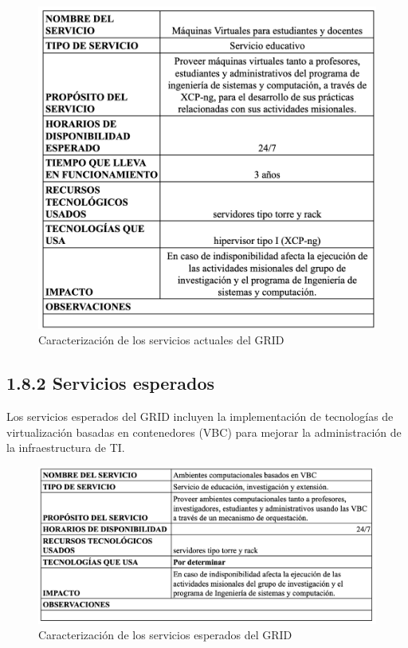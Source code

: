 \begin{figure}[H]
    \centering
    \includegraphics[width=\textwidth] {tablas-images/cp1/servicios-actuales/servicios-actuales.png}
    \caption{Caracterización de los servicios actuales del GRID}\label{fig:servicios-actuales}
\end{figure}

\subsection*{1.8.2 Servicios esperados}
Los servicios esperados del GRID incluyen la implementación de tecnologías de virtualización basadas en contenedores (VBC) para mejorar la administración de la infraestructura de TI.

\begin{figure}[H]
    \centering
    \includegraphics[width=\textwidth] {tablas-images/cp1/servicios-esperados/servicios-esperados.png}
    \caption{Caracterización de los servicios esperados del GRID}\label{fig:servicios-esperados}
\end{figure}

